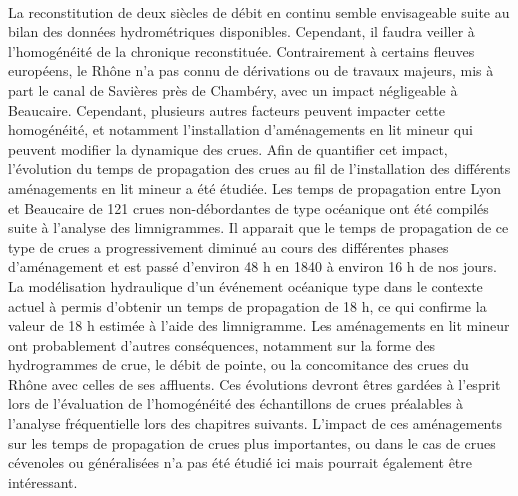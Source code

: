 	\paragraph{} La reconstitution de deux siècles de débit en continu semble envisageable suite au bilan des données hydrométriques disponibles. Cependant, il faudra veiller à l'homogénéité de la chronique reconstituée. Contrairement à certains fleuves européens, le Rhône n'a pas connu de dérivations ou de travaux majeurs, mis à part le canal de Savières près de Chambéry, avec un impact négligeable à Beaucaire. Cependant, plusieurs autres facteurs peuvent impacter cette homogénéité, et notamment l'installation d'aménagements en lit mineur qui peuvent modifier la dynamique des crues. Afin de quantifier cet impact, l'évolution du temps de propagation des crues au fil de l'installation des différents aménagements en lit mineur a été étudiée. Les temps de propagation entre Lyon et Beaucaire de 121 crues non-débordantes de type océanique ont été compilés suite à l'analyse des limnigrammes. Il apparait que le temps de propagation de ce type de crues a progressivement diminué au cours des différentes phases d'aménagement et est passé d'environ 48 h en 1840 à environ 16 h de nos jours. La modélisation hydraulique d'un événement océanique type dans le contexte actuel à permis d'obtenir un temps de propagation de 18 h, ce qui confirme la valeur de 18 h estimée à l'aide des limnigramme. Les aménagements en lit mineur ont probablement d'autres conséquences, notamment sur la forme des hydrogrammes de crue, le débit de pointe, ou la concomitance des crues du Rhône avec celles de ses affluents. Ces évolutions devront êtres gardées à l'esprit lors de l'évaluation de l'homogénéité des échantillons de crues préalables à l'analyse fréquentielle lors des chapitres suivants. L'impact de ces aménagements sur les temps de propagation de crues plus importantes, ou dans le cas de crues cévenoles ou généralisées n'a pas été étudié ici mais pourrait également être intéressant.
	
